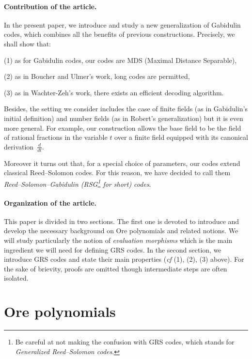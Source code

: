 \documentclass[a4paper]{llncs}
\begin{document}
\paragraph{Contribution of the article.}

In the present paper, we introduce and study a new generalization 
of Gabidulin codes, which combines all the benefits of previous 
constructions. Precisely, we shall show that:

\noindent
(1) as for Gabidulin codes, our codes are MDS (Maximal Distance
Separable),

\noindent
(2) as in Boucher and Ulmer's work, long codes are permitted,

\noindent
(3) as in Wachter-Zeh's work, there exists an efficient decoding algorithm.

\smallskip

\noindent 
Besides, the setting we consider includes the case of finite fields (as 
in Gabidulin's initial definition) and number fields (as in Robert's 
generalization) but it is even more general. 
For example, our construction allows the base field to be the field of 
rational fractions in the variable $t$ over a finite field equipped with 
its canonical derivation~$\frac d{dt}$.

Moreover it turns out that, for a special choice of parameters, our 
codes extend classical Reed--Solomon codes. For this reason, we have 
decided to call them \emph{Reed--Solomon--Gabidulin (RSG\footnote{Be 
careful at not making the confusion with GRS codes, which stands for 
\emph{Generalized Reed--Solomon codes}.} for short) codes}.

\paragraph{Organization of the article.}

This paper is divided in two sections. 
The first one is devoted to introduce and develop the necessary 
background on Ore polynomials and related notions. We will study
particularly the notion of \emph{evaluation morphisms} which is 
the main ingredient we will need for defining GRS codes.
In the second section, we introduce GRS codes and state their main 
properties (\emph{cf} (1), (2), (3) above). For the sake of brievity, 
proofs are omitted though intermediate steps are often isolated.

\section{Ore polynomials}
\end{document}
